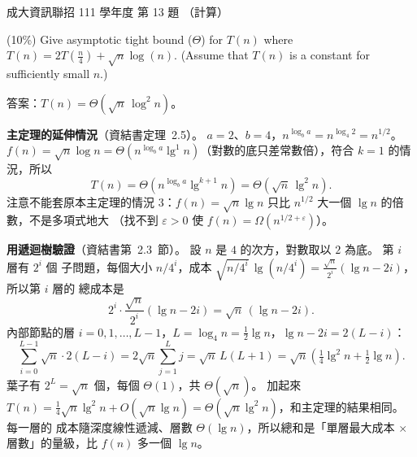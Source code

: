 \begin{pastexam}[label={px:ncku-111-prog-13}]{成大資訊聯招 111 學年度 第 13 題}
（計算）

(10\%) Give asymptotic tight bound ($\Theta$) for $T(n)$ where $T(n)=2T\left(\frac{n}{4}\right)+\sqrt{n}\log(n)$. (Assume that $T(n)$ is a constant for sufficiently small $n$.)
\end{pastexam}

\begin{pastsoln}
答案：$T(n) = \Theta(\sqrt{n}\,\log^2 n)$。

\textbf{主定理的延伸情況}（資結書定理~2.5）。 $a = 2$、$b = 4$，$n^{\log_b a} = n^{\log_4 2} = n^{1/2}$。
$f(n) = \sqrt{n}\log n = \Theta(n^{\log_b a} \lg^1 n)$（對數的底只差常數倍），符合 $k = 1$ 的情況，所以
\[
T(n) = \Theta(n^{\log_b a} \lg^{k+1} n) = \Theta(\sqrt{n}\,\lg^2 n).
\]
注意不能套原本主定理的情況 3：$f(n) = \sqrt{n}\lg n$ 只比 $n^{1/2}$ 大一個 $\lg n$ 的倍數，不是多項式地大
（找不到 $\varepsilon > 0$ 使 $f(n) = \Omega(n^{1/2 + \varepsilon})$）。

\textbf{用遞迴樹驗證}（資結書第~2.3~節）。 設 $n$ 是 $4$ 的次方，對數取以 $2$ 為底。 第 $i$ 層有 $2^i$ 個
子問題，每個大小 $n/4^i$，成本 $\sqrt{n/4^i}\,\lg(n/4^i) = \frac{\sqrt{n}}{2^i}(\lg n - 2i)$，所以第 $i$ 層的
總成本是
\[
2^i \cdot \frac{\sqrt{n}}{2^i}(\lg n - 2i) = \sqrt{n}\,(\lg n - 2i).
\]
內部節點的層 $i = 0, 1, \ldots, L - 1$，$L = \log_4 n = \frac{1}{2}\lg n$，$\lg n - 2i = 2(L - i)$：
\[
\sum_{i=0}^{L-1} \sqrt{n}\cdot 2(L - i) = 2\sqrt{n} \sum_{j=1}^{L} j = \sqrt{n}\, L(L + 1)
= \sqrt{n}\left(\tfrac{1}{4}\lg^2 n + \tfrac{1}{2}\lg n\right).
\]
葉子有 $2^L = \sqrt{n}$ 個，每個 $\Theta(1)$，共 $\Theta(\sqrt{n})$。 加起來
$T(n) = \frac{1}{4}\sqrt{n}\lg^2 n + O(\sqrt{n}\lg n) = \Theta(\sqrt{n}\lg^2 n)$，和主定理的結果相同。 每一層的
成本隨深度線性遞減、層數 $\Theta(\lg n)$，所以總和是「單層最大成本 $\times$ 層數」的量級，比 $f(n)$ 多一個
$\lg n$。
\end{pastsoln}
